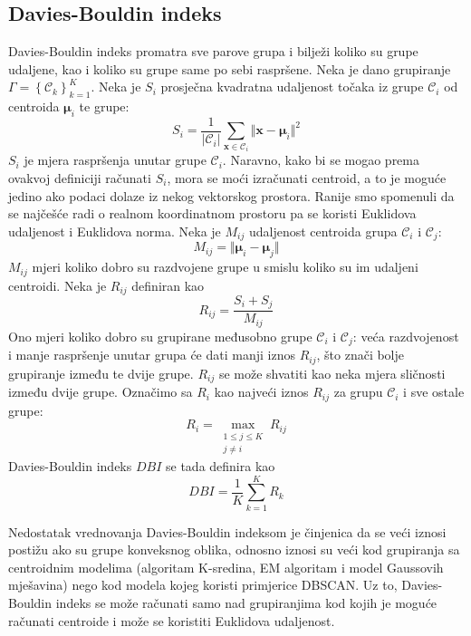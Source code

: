 \documentclass[times, utf8, zavrsni]{fer}
\begin{document}
\subsection{Davies-Bouldin indeks}
Davies-Bouldin indeks promatra sve parove grupa i bilježi koliko su grupe udaljene, kao i koliko su grupe same po sebi raspršene. Neka je dano grupiranje $\Gamma = \left\{\mathcal{C}_k\right\}_{k=1}^{K}$. Neka je $S_i$ prosječna kvadratna udaljenost točaka iz grupe $\mathcal{C}_i$ od centroida $\boldsymbol{\mu}_i$ te grupe:
\[S_i = \frac{1}{\left\vert \mathcal{C}_i \right\vert}
\sum_{\mathbf{x} \in \mathcal{C}_i} \Vert \mathbf{x} - \boldsymbol{\mu}_i  \Vert^2
\]
$S_i$ je mjera raspršenja unutar grupe $\mathcal{C}_i$. Naravno, kako bi se mogao prema ovakvoj definiciji računati $S_i$, mora se moći izračunati centroid, a to je moguće jedino ako podaci dolaze iz nekog vektorskog prostora. Ranije smo spomenuli da se najčešće radi o realnom koordinatnom prostoru pa se koristi Euklidova udaljenost i Euklidova norma. Neka je $M_{ij}$ udaljenost centroida grupa $\mathcal{C}_i$ i $\mathcal{C}_j$:
\[M_{ij} = \Vert \boldsymbol{\mu}_i - \boldsymbol{\mu}_j \Vert\]
$M_{ij}$ mjeri koliko dobro su razdvojene grupe u smislu koliko su im udaljeni centroidi. Neka je $R_{ij}$ definiran kao
\[R_{ij} = \frac{S_i + S_j}{M_{ij}}\]
Ono mjeri koliko dobro su grupirane međusobno grupe $\mathcal{C}_i$ i $\mathcal{C}_j$: veća razdvojenost i manje raspršenje unutar grupa će dati manji iznos $R_{ij}$, što znači bolje grupiranje između te dvije grupe. $R_{ij}$ se može shvatiti kao neka mjera sličnosti između dvije grupe. Označimo sa $R_i$ kao najveći iznos $R_{ij}$ za grupu $\mathcal{C}_i$ i sve ostale grupe:
\[R_i = \max_{\substack{1 \leq j \leq K \\ j \neq i}} R_{ij}\]
Davies-Bouldin indeks $DBI$ se tada definira kao
\[DBI = \frac{1}{K} \sum_{k=1}^{K} R_k\]

Nedostatak vrednovanja Davies-Bouldin indeksom je činjenica da se veći iznosi postižu ako su grupe konveksnog oblika, odnosno iznosi su veći kod grupiranja sa centroidnim modelima (algoritam K-sredina, EM algoritam i model Gaussovih mješavina) nego kod modela kojeg koristi primjerice DBSCAN. Uz to, Davies-Bouldin indeks se može računati samo nad grupiranjima kod kojih je moguće računati centroide i može se koristiti Euklidova udaljenost.
\end{document}
